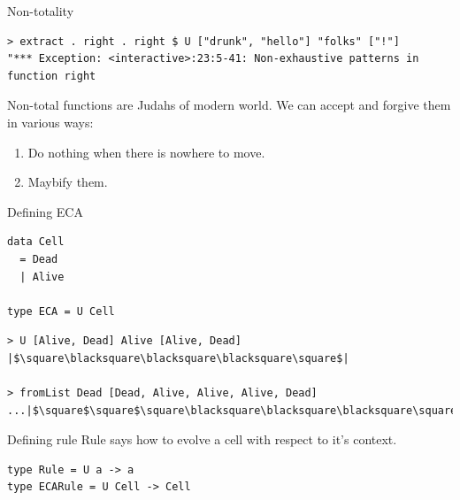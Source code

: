 \documentclass[presentation,aspectratio=169,smaller]{beamer}
\begin{document}
\begin{frame}[label={sec:orgf708a43},fragile]{Non-totality}
 \begin{verbatim}
> extract . right . right $ U ["drunk", "hello"] "folks" ["!"]
"*** Exception: <interactive>:23:5-41: Non-exhaustive patterns in function right
\end{verbatim}

Non-total functions are Judahs of modern world. We can accept and forgive them
in various ways:

\begin{enumerate}
\item Do nothing when there is nowhere to move.
\item Maybify them.
\end{enumerate}
\end{frame}

\begin{frame}[label={sec:orgb350d2f},fragile]{Defining ECA}
 \begin{verbatim}
data Cell
  = Dead
  | Alive

type ECA = U Cell
\end{verbatim}

\pause

\begin{verbatim}
> U [Alive, Dead] Alive [Alive, Dead]
|$\square\blacksquare\blacksquare\blacksquare\square$|

> fromList Dead [Dead, Alive, Alive, Alive, Dead]
...|$\square$\square$\square\blacksquare\blacksquare\blacksquare\square$\square$\square$|...
\end{verbatim}
\end{frame}

\begin{frame}[label={sec:org4c2c89a},fragile]{Defining rule}
 Rule says how to evolve a cell with respect to it's context.

\pause

\begin{verbatim}
type Rule = U a -> a
type ECARule = U Cell -> Cell
\end{verbatim}
\end{frame}
\end{document}

